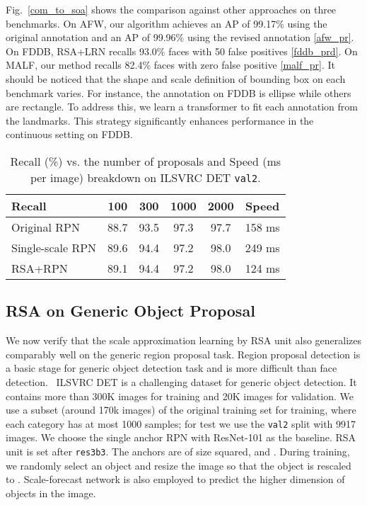 \documentclass[10pt,twocolumn,letterpaper]{article}
\begin{document}
Fig.~\ref{com_to_soa} shows the comparison against other approaches on three benchmarks. On AFW, our algorithm achieves an AP of 99.17\% using the original annotation and an AP of 99.96\% using the revised  annotation \ref{afw_pr}. On FDDB, RSA+LRN recalls 93.0\% faces with 50 false positives \ref{fddb_prd}. On MALF, our method recalls 82.4\% faces with zero false positive \ref{malf_pr}. It should be noticed that the shape and scale definition of bounding box on each benchmark varies. For instance, the annotation on FDDB is ellipse while others are rectangle. To address this, we learn a transformer to fit each annotation from the landmarks. This strategy significantly enhances  performance  in the continuous setting on FDDB.





\begin{table}
	\caption{Recall (\%) vs. the number of proposals and Speed (ms per image) breakdown on ILSVRC DET \texttt{val2}.}
	\vspace{-.2cm}
	\begin{center}
		\footnotesize{
			\begin{tabular}{l|c c c c |c}
				\toprule
				Recall  		 & 100 	& 300 	& 1000 	& 2000 & Speed\\
				\midrule
				Original RPN 	 & 88.7 & 93.5 & 97.3 & 97.7 & 158 ms \\
				Single-scale RPN & 89.6 & 94.4 & 97.2 & 98.0 & 249 ms \\
				RSA+RPN 		 & 89.1 & 94.4 & 97.2 & 98.0 & 124 ms \\
				\bottomrule
			\end{tabular}
		}
	\end{center}
	\label{imgnt_test}
	\vspace{-.7cm}
\end{table}


\subsection{RSA on Generic Object Proposal}
\label{imagenet}
We now verify that the scale approximation learning by RSA unit also generalizes comparably well on the generic region proposal task.
Region proposal detection is a basic stage for generic object detection task and is more difficult than face detection. \
ILSVRC DET \cite{imagenet_conf} is a challenging dataset for generic object detection. It contains more than 300K images for training and 20K images for validation. 
We use a subset (around 170k images) of the original training set for training, where 
each category has at most 1000 samples; for test we use the \texttt{val2} split \cite{girshick2014rich} with 9917 images.
We choose the single anchor RPN with ResNet-101 as the baseline. RSA unit is set after \texttt{res3b3}. 
The anchors are of size  squared,  and . 
During training, we randomly select an object and resize the image so that the object is rescaled to
. Scale-forecast network is also employed to predict the higher dimension of objects in the image. 
\end{document}
